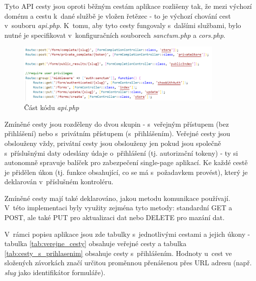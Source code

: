 	Tyto API cesty jsou oproti běžným cestám aplikace rozlišeny tak, že mezi výchozí doménu a cestu k~dané službě je vložen řetězec \textit{} - to je výchozí chování cest v~souboru \textit{api.php}. K~tomu, aby tyto cesty fungovaly s~dalšími službami, bylo nutné je specifikovat v~konfiguračních souborech \textit{sanctum.php} a \textit{cors.php}.
	
	\begin{figure}[H]
		\centering %
		\includegraphics[width=0.9\textwidth]{img/routes/api_routes.png} %
		\caption{Část kódu \textit{api.php}} %
		\label{fig:routes_api} %
	\end{figure}
	
	Zmíněné cesty jsou rozděleny do dvou skupin - s~veřejným přístupem (bez přihlášení) nebo s~privátním přístupem (s~přihlášením). Veřejné cesty jsou obslouženy vždy, privátní cesty jsou obslouženy jen pokud jsou společně s~příslušnými daty odeslány údaje o~přihlášení (tj. autorizační tokeny) - ty si autonomně spravuje balíček  pro zabezpečení single-page aplikací. Ke každé cestě je přidělen úkon (tj. funkce obsahující, co se má s~požadavkem provést), který je deklarován v~příslušném kontroléru. 
	
	Zmíněné cesty mají také deklarováno, jakou metodu komunikace používají. V~této implementaci byly využity zejména tyto metody: standardní GET a POST, ale také PUT pro aktualizaci dat nebo DELETE pro mazání dat.
	
	V~rámci popisu aplikace jsou zde tabulky s~jednotlivými cestami a jejich úkony - tabulka \ref{tab:verejne_cesty} obsahuje veřejné cesty a tabulka \ref{tab:cesty_s_prihlasenim} obsahuje cesty s~přihlášením. Hodnoty u~cest ve složených závorkách značí určitou proměnnou přenášenou přes URL adresu (např. \textit{slug} jako identifikátor formuláře).
	
